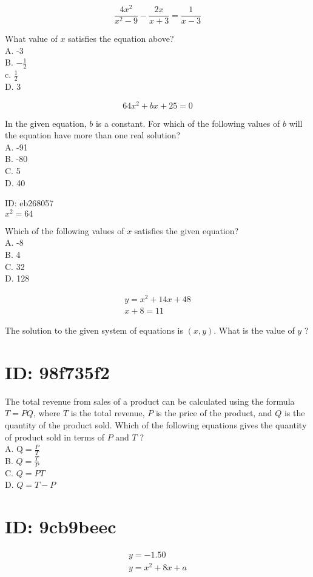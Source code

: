 $$
\frac{4 x^{2}}{x^{2}-9}-\frac{2 x}{x+3}=\frac{1}{x-3}
$$

What value of $x$ satisfies the equation above?\\
A. -3\\
B. $-\frac{1}{2}$\\
c. $\frac{1}{2}$\\
D. 3

$$
64 x^{2}+b x+25=0
$$

In the given equation, $b$ is a constant. For which of the following values of $b$ will the equation have more than one real solution?\\
A. -91\\
B. -80\\
C. 5\\
D. 40

ID: eb268057\\
$x^{2}=64$

Which of the following values of $x$ satisfies the given equation?\\
A. -8\\
B. 4\\
C. 32\\
D. 128

$$
\begin{gathered}
y=x^{2}+14 x+48 \\
x+8=11
\end{gathered}
$$

The solution to the given system of equations is $(x, y)$. What is the value of $y$ ?

\section*{ID: 98f735f2}
The total revenue from sales of a product can be calculated using the formula $T=P Q$, where $T$ is the total revenue, $P$ is the price of the product, and $Q$ is the quantity of the product sold. Which of the following equations gives the quantity of product sold in terms of $P$ and $T$ ?\\
A. $\mathrm{Q}=\frac{P}{T}$\\
B. $Q=\frac{T}{P}$\\
C. $Q=P T$\\
D. $Q=T-P$

\section*{ID: 9cb9beec}
$$
\begin{gathered}
y=-1.50 \\
y=x^{2}+8 x+a
\end{gathered}
$$

